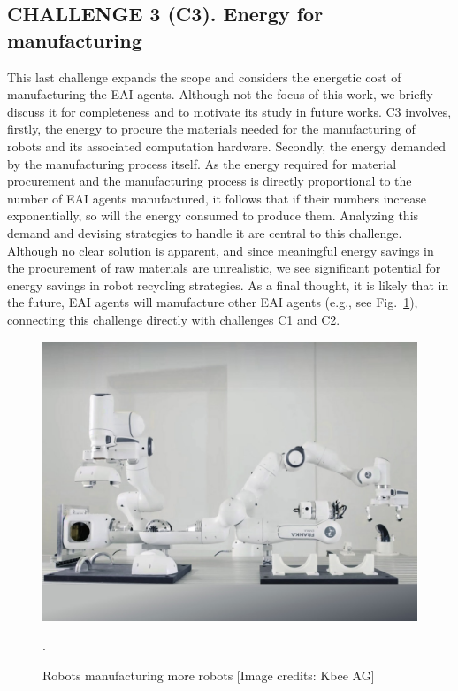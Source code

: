 \subsection{\textbf{CHALLENGE 3} (C3). Energy for manufacturing}
This last challenge expands the scope and considers the energetic cost of manufacturing the EAI agents. Although not the focus of this work, we briefly discuss it for completeness and to motivate its study in future works. C3 involves, firstly, the energy to procure the materials needed for the manufacturing of robots and its associated computation hardware. Secondly, the energy demanded by the manufacturing process itself. As the energy required for material procurement and the manufacturing process is directly proportional to the number of EAI agents manufactured, it follows that if their numbers increase exponentially, so will the energy consumed to produce them. Analyzing this demand and devising strategies to handle it are central to this challenge. Although no clear solution is apparent, and since meaningful energy savings in the procurement of raw materials are unrealistic, we see significant potential for energy savings in robot recycling strategies. As a final thought, it is likely that in the future, EAI agents will manufacture other EAI agents (e.g., see Fig.~\ref{fig:franka_builds_franka}), connecting this challenge directly with challenges C1 and C2.
\begin{figure}[!t]
	\centering
	\includegraphics[width=0.75\columnwidth]{fig/franka_builds_franka.jpg}
	\caption{Robots manufacturing more robots [Image credits: Kbee AG]}.
	\label{fig:franka_builds_franka}
\end{figure}

